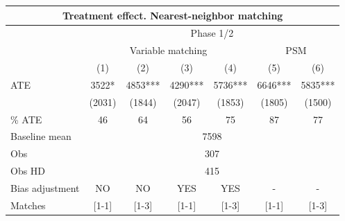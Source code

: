 \begin{tabular}{lcccc|cc}
\toprule
\multicolumn{7}{c}{Treatment effect. Nearest-neighbor matching} \\
\midrule
\midrule
      & \multicolumn{6}{c}{Phase 1/2} \\
\midrule
\midrule
      & \multicolumn{4}{c|}{Variable matching} & \multicolumn{2}{c}{PSM} \\
\midrule
\midrule
      & (1)   & (2)   & (3)   & (4)   & (5)   & (6) \\
\midrule
ATE   & 3522* & 4853*** & 4290*** & 5736*** & 6646*** & 5835*** \\
      & (2031) & (1844) & (2047) & (1853) & (1805) & (1500) \\
\% ATE & 46    & 64    & 56    & 75    & 87    & 77 \\
Baseline mean & \multicolumn{6}{c}{7598} \\
Obs   & \multicolumn{6}{c}{307} \\
Obs HD & \multicolumn{6}{c}{415} \\
Bias adjustment & NO    & NO    & YES   & YES   & -     & - \\
Matches & [1-1] & [1-3] & [1-1] & [1-3] & [1-1] & [1-3] \\
\bottomrule
\bottomrule
\end{tabular}%
